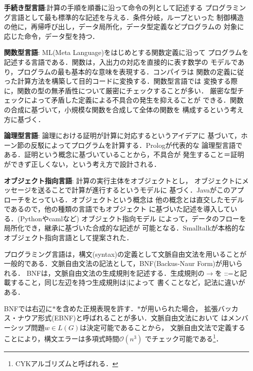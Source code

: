\documentclass[a4j,dvipdfmx]{jbook}
\begin{document}
\begin{list}{}{}
  \item {\bf 手続き型言語}:計算の手順を順番に沿って命令の列として記述する
        プログラミング言語として最も標準的な記述を与える．条件分岐，ループといった
        制御構造の他に，再帰呼び出し，データ局所化，データ型定義などプログラムの
        対象に応じた命令，データ型を持つ．
  \item {\bf 関数型言語}: ML(Meta Language)をはじめとする関数定義に沿って
        プログラムを記述する言語である．関数は，入出力の対応を直接的に表す数学の
        モデルであり，プログラムの最も基本的な意味を表現する．コンパイラは
        関数の定義に従った計算方法を構築して目的コードに変換する．関数型言語では
        変換する際に，関数の型の無矛盾性について厳密にチェックすることが多い．
        厳密な型チェックによって矛盾した定義による不具合の発生を抑えることが
        できる．関数の合成に基づいて，小規模な関数を合成して全体の関数を
        構成するという考え方に基づく．
  \item {\bf 論理型言語}: 論理における証明が計算に対応するというアイデアに
        基づいて，ホーン節の反駁によってプログラムを計算する．Prologが代表的な
        論理型言語である．証明という概念に基づいていることから，不具合が
        発生すること＝証明ができず正しくない，という考え方で設計される．
  \item {\bf オブジェクト指向言語}: 計算の実行主体をオブジェクトとし，
        オブジェクトにメッセージを送ることで計算が進行するというモデルに
        基づく．Javaがこのアプローチをとっている．オブジェクトという概念は
        他の概念とは直交したモデルであるので，他の種類の言語でもオブジェクト
        に基づいた記述を導入している．(Pythonやcamlなど) オブジェクト指向モデル
        によって，データのフローを局所化でき，継承に基づいた合成的な記述が
        可能となる．Smalltalkが本格的なオブジェクト指向言語として提案された．
\end{list}

プログラミング言語は，構文(syntax)の定義として文脈自由文法を用いることが
一般的である．文脈自由文法の記法として，BNF(Backus-Naur Form)が用いられる．
BNFは，文脈自由文法の生成規則を記述する．生成規則の$\rightarrow$を
$\texttt{::=}$と記載すること，同じ左辺を持つ生成規則は$\texttt{|}$によって
書くことなど，記法に違いがある．

BNFでは右辺に$\ast$を含めた正規表現を許す．$\ast$が用いられた場合，
拡張バッカス・ナウア形式(EBNF)と呼ばれることが多い．文脈自由文法において
はメンバーシップ問題$w\in L(G)$は決定可能であることから，
文脈自由文法で定義することにより，構文エラーは多項式時間$\mathcal{O}(n^3)$
でチェック可能である\footnote{CYKアルゴリズムと呼ばれる．}．
\end{document}
